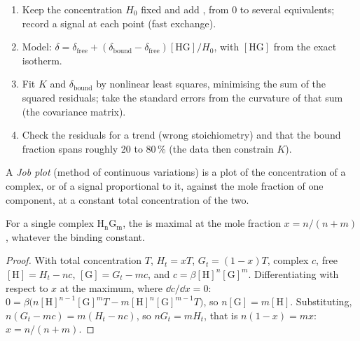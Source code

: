 \begin{method}\label{met:b3:supramolecular:nmr-titration}
\begin{enumerate}
  \item Keep the  concentration $H_0$ fixed and add , from 0 to several
        equivalents; record a  signal at each point (fast exchange).
  \item Model: $\delta = \delta_{\mathrm{free}} + (\delta_{\mathrm{bound}} - \delta_{\mathrm{free}})[\mathrm{HG}]/H_0$, with $[\mathrm{HG}]$ from the exact isotherm.
  \item Fit $K$ and $\delta_{\mathrm{bound}}$ by nonlinear least squares, minimising the sum of the squared
        residuals; take the standard errors from the curvature of that sum
        (the covariance matrix).
  \item Check the residuals for a trend (wrong stoichiometry) and that the
        bound fraction spans roughly 20 to 80\,\% (the data then constrain $K$).
\end{enumerate}
\end{method}

\begin{definition}\label{def:b3:supramolecular:job}
A \emph{Job plot} (method of continuous variations) is a plot of
the concentration of a complex, or of a signal proportional to it, against
the mole fraction of one component, at a constant total concentration of the
two.
\end{definition}

\begin{proposition}\label{prop:b3:supramolecular:job}
For a single complex $\mathrm{H_nG_m}$, the  is maximal at the  mole fraction
$x = n/(n + m)$, whatever the binding constant.
\end{proposition}

\begin{proof}
With total concentration $T$, $H_t = xT$, $G_t = (1 - x)T$, complex $c$, free $[\mathrm H] = H_t - nc$,
$[\mathrm G] = G_t - mc$, and $c = \beta[\mathrm H]^n[\mathrm G]^m$. Differentiating with respect to $x$ at the maximum, where
$\dd c/\dd x = 0$: $0 = \beta\bigl(n[\mathrm H]^{n-1}[\mathrm G]^m T - m[\mathrm H]^n[\mathrm G]^{m-1}T\bigr)$, so $n[\mathrm G] = m[\mathrm H]$. Substituting,
$n(G_t - mc) = m(H_t - nc)$, so $nG_t = mH_t$, that is $n(1 - x) = mx$: $x = n/(n + m)$.
\end{proof}

